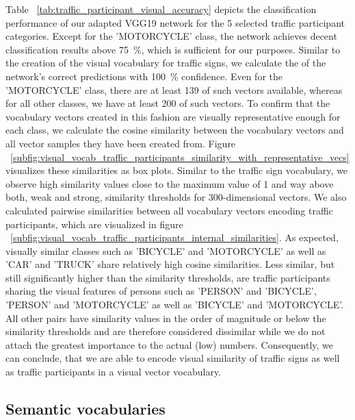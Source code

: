Table ~\ref{tab:traffic_participant_visual_accuracy} depicts the classification performance of our adapted VGG19 network for the \num{5} selected traffic participant categories.
Except for the 'MOTORCYCLE' class, the network achieves decent classification results above \SI{75}{\percent}, which is sufficient for our purposes.
Similar to the creation of the visual vocabulary for traffic signs, we calculate the of the network's correct predictions with \SI{100}{\percent} confidence.
Even for the 'MOTORCYCLE' class, there are at least \num{139} of such vectors available, whereas for all other classes, we have at least \num{200} of such vectors.
To confirm that the vocabulary vectors created in this fashion are visually representative enough for each class, we calculate the cosine similarity between the vocabulary vectors and all vector samples they have been created from.
Figure ~\ref{subfig:visual_vocab_traffic_participants_similarity_with_representative_vecs} visualizes these similarities as box plots.
Similar to the traffic sign vocabulary, we observe high similarity values close to the maximum value of \num{1} and way above both, weak and strong, similarity thresholds for \num{300}-dimensional vectors.
We also calculated pairwise similarities between all vocabulary vectors encoding traffic participants, which are visualized in figure ~\ref{subfig:visual_vocab_traffic_participants_internal_similarities}.
As expected, visually similar classes such as 'BICYCLE' and 'MOTORCYCLE' as well as 'CAR' and 'TRUCK' share relatively high cosine similarities.
Less similar, but still significantly higher than the similarity thresholds, are traffic participants sharing the visual features of persons such as 'PERSON' and 'BICYCLE', 'PERSON' and 'MOTORCYCLE' as well as 'BICYCLE' and 'MOTORCYCLE'.
All other pairs have similarity values in the order of magnitude or below the similarity thresholds and are therefore considered dissimilar while we do not attach the greatest importance to the actual (low) numbers.
Consequently, we can conclude, that we are able to encode visual similarity of traffic signs as well as traffic participants in a visual vector vocabulary.

\subsection{Semantic vocabularies}%
\label{subsec:semantic_vocabularies}

